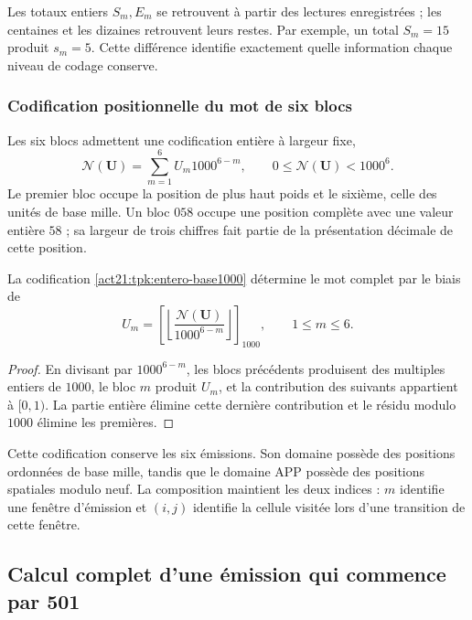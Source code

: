 Les totaux entiers \(S_m,E_m\) se retrouvent à partir des lectures enregistrées ;
les centaines et les dizaines retrouvent leurs restes. Par exemple, un total
\(S_m=15\) produit \(s_m=5\). Cette différence identifie exactement
quelle information chaque niveau de codage conserve.



\subsubsection{Codification positionnelle du mot de six blocs}

Les six blocs admettent une codification entière à largeur fixe,
\begin{equation}
 \mathscr N(\mathbf U)=\sum_{m=1}^{6}U_m1000^{6-m},
 \qquad0\leq\mathscr N(\mathbf U)<1000^6.
 \label{act21:tpk:entero-base1000}
\end{equation}
Le premier bloc occupe la position de plus haut poids et le sixième, celle des unités de base mille. Un bloc \(058\) occupe une position complète avec une valeur entière \(58\) ; sa largeur de trois chiffres fait partie de la présentation décimale de cette position.

\begin{proposition}
\label{act21:tpk:inversa-base1000}
La codification \eqref{act21:tpk:entero-base1000} détermine le mot complet
par le biais de
\[
 U_m=\left[\left\lfloor
 \frac{\mathscr N(\mathbf U)}{1000^{6-m}}\right\rfloor\right]_{1000},
 \qquad1\leq m\leq6.
\]
\end{proposition}
\begin{proof}
En divisant par \(1000^{6-m}\), les blocs précédents produisent des multiples entiers de \(1000\), le bloc \(m\) produit \(U_m\), et la contribution des suivants appartient à \([0,1)\). La partie entière élimine cette dernière contribution et le résidu modulo \(1000\) élimine les premières.
\end{proof}

Cette codification conserve les six émissions. Son domaine possède des positions ordonnées de base mille, tandis que le domaine APP possède des positions spatiales modulo neuf. La composition maintient les deux indices : \(m\) identifie une fenêtre d'émission et \((i,j)\) identifie la cellule visitée lors d'une transition de cette fenêtre.

\subsection{Calcul complet d'une émission qui commence par 501}
\label{act21:tpk:ejemplo501}

